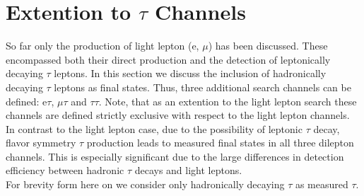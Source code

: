 \section{Extention to $\tau$ Channels} \label{sec:tauSignal}
So far only the production of light lepton (e, $\mu$) has been discussed. These encompassed both their direct production and
the detection of leptonically decaying $\tau$ leptons. In this section we discuss the inclusion of hadronically decaying
$\tau$ leptons as final states. Thus, three
additional search channels can be defined: e$\tau$, $\mu\tau$ and $\tau\tau$. Note, that as an extention to the light lepton
search these channels are defined strictly exclusive with respect to the light lepton channels.\\
In contrast to the light lepton case, due to the possibility of leptonic $\tau$ decay,  flavor symmetry $\tau$ production
leads to measured final states in all three dilepton channels. This is especially significant due to the large differences in
detection efficiency between hadronic $\tau$ decays and light leptons.\\
For brevity form here on we consider only hadronically decaying $\tau$ as measured $\tau$.
